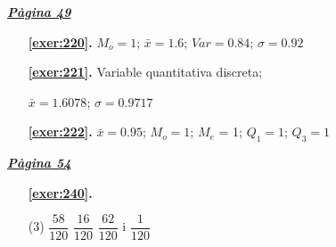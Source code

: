 
\hyperlink{page.49}{\textbf{\em Pàgina 49}}
\begin{enumerate}
\item[\fontfamily{phv}\selectfont\color{blue}\textbf{\ref{exer:220}. }] \label{ans:220} 
$M_o =1$; $\bar x=1.6$; $Var=0.84$; $\sigma =0.92$\par {}
 \end{enumerate}
\begin{enumerate}
\item[\fontfamily{phv}\selectfont\color{blue}\textbf{\ref{exer:221}. }] \label{ans:221} 
Variable quantitativa discreta;\par $\bar x=1.6078$; $\sigma =0.9717$\par {}
\item[\fontfamily{phv}\selectfont\color{blue}\textbf{\ref{exer:222}. }] \label{ans:222} 
$\bar x=0.95$; $M_o=1$; $M_e$ = 1; $Q_1 = 1$; $Q_3= 1$ \par {} 
 \end{enumerate}
\vspace{0.3cm}


\hyperlink{page.54}{\textbf{\em Pàgina 54}}
\begin{enumerate}



 \item[\fontfamily{phv}\selectfont\color{blue}\textbf{\ref{exer:240}. }] \label{ans:240}
 \begin{tasks}[column-sep=1em, item-indent=1.3333em](3)
	 \task $\dfrac {58}{120}$
	 \task $\dfrac {16}{120}$
	 \task* $\dfrac {62}{120}$ i $\dfrac {1}{120}$ 
\end{tasks}
 \end{enumerate}
\vspace{0.3cm}



